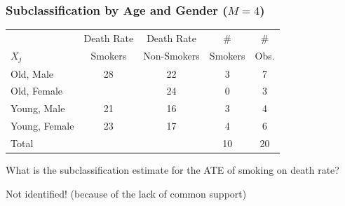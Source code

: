 \documentclass[xcolor=dvipsnames]{beamer}
\begin{document}
\begin{frame}[t]
  \frametitle{Subclassification by Age and Gender ($M=4$)}
{\small
\begin{center}
\begin{tabular}{l|c|c|c|c}
           & Death Rate & Death Rate &              \# &         \#  \\
       $X_j$ &    Smokers & Non-Smokers &         Smokers &       Obs. \\
       \hline
 Old, Male &         28 &         22 &                 3 &          7 \\
 \hline
Old, Female &            &         24 &                0 &          3 \\
\hline
Young, Male &         21 &         16 &                 3 &          4 \\
\hline
Young, Female &         23 &         17 &             4 &          6 \\
\hline
     Total &            &            &                10 &         20 \\
\end{tabular}
\end{center}
}

\bigskip
\small 
What is the subclassification estimate for the ATE of smoking on death rate?

\pause
\bigskip

Not identified! (because of the lack of common support)

\end{frame}
\end{document}
